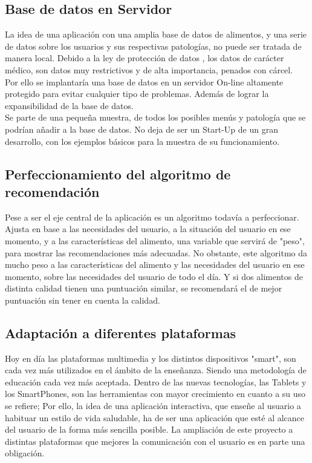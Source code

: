 \subsection{Base de datos en Servidor}
La idea de una aplicación con una amplia base de datos de alimentos, y una serie de datos sobre los usuarios y sus respectivas patologías, no puede ser tratada de manera local. Debido a la ley de protección de datos \cite{LeyProteccionDatos}, los datos de carácter médico, son datos muy restrictivos y de alta importancia, penados con cárcel.\\
Por ello se implantaría una base de datos en un servidor On-line altamente protegido para evitar cualquier tipo de problemas. Además de lograr la expansibilidad de la base de datos.\\
Se parte de una pequeña muestra, de todos los posibles menús y patología que se podrían añadir a la base de datos. No deja de ser un Start-Up de un gran desarrollo, con los ejemplos básicos para la muestra de su funcionamiento.

\subsection{Perfeccionamiento del algoritmo de recomendación}
Pese a ser el eje central de la aplicación es un algoritmo todavía a perfeccionar. Ajusta en base a las necesidades del usuario, a la situación del usuario en ese momento, y a las características del alimento, una variable que servirá de "peso", para mostrar las recomendaciones más adecuadas. No obstante, este algoritmo da mucho peso a las características del alimento y las necesidades del usuario en ese momento, sobre las necesidades del usuario de todo el día. Y si dos alimentos de distinta calidad tienen una puntuación similar, se recomendará el de mejor puntuación sin tener en cuenta la calidad.

\subsection{Adaptación a diferentes plataformas}
Hoy en día las plataformas multimedia y los distintos dispositivos "smart", son cada vez más utilizados en el ámbito de la enseñanza. Siendo una metodología de educación cada vez más aceptada. Dentro de las nuevas tecnologías, las Tablets y los SmartPhones, son las herramientas con mayor crecimiento en cuanto a su uso se refiere; Por ello, la idea de una aplicación interactiva, que enseñe al usuario a habituar un estilo de vida saludable, ha de ser una aplicación que esté al alcance del usuario de la forma más sencilla posible. La ampliación de este proyecto a distintas plataformas que mejores la comunicación con el usuario es en parte una obligación.

